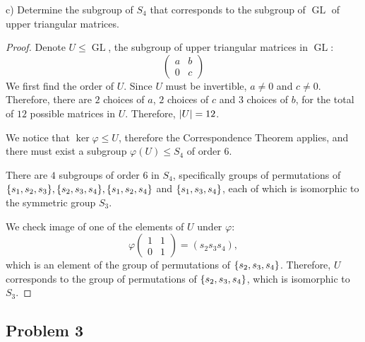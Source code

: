 \documentclass{article}
\theoremstyle{definition}
\newcommand{\GL}{\operatorname{GL}}
\DeclarePairedDelimiter\set{\{}{\}}
\DeclarePairedDelimiter\abs{\lvert}{\rvert}
\begin{document}
\begin{tcolorbox}
c) Determine the subgroup of $S_4$ that corresponds to the subgroup of $\GL$ of upper triangular matrices.
\end{tcolorbox}

\begin{proof}

Denote $U \leq \GL$, the subgroup of upper triangular matrices in $\GL$:
\[
    \begin{pmatrix}
        a & b \\
        0 & c
    \end{pmatrix}
\]
We first find the order of $U$. Since $U$ must be invertible, $a \neq 0$ and $c \neq 0$. Therefore, there are $2$ choices of $a$, $2$ choices of $c$ and $3$ choices of $b$, for the total of $12$ possible matrices in $U$. Therefore, $\abs{U}=12$.

We notice that $\ker \varphi \leq U$, therefore the Correspondence Theorem applies, and there must exist a subgroup $\varphi(U) \leq S_4$ of order $6$.

There are $4$ subgroups of order $6$ in $S_4$, specifically groups of permutations of $\set{s_1,s_2,s_3}, \set{s_2,s_3,s_4}, \set{s_1,s_2,s_4}$ and $\set{s_1,s_3,s_4}$, each of which is isomorphic to the symmetric group $S_3$.

We check image of one of the elements of $U$ under $\varphi$:
\[
    \varphi
    \begin{pmatrix}
        1 & 1 \\
        0 & 1
    \end{pmatrix} = 
    (s_2 s_3 s_4),
\]
which is an element of the group of permutations of $\set{s_2,s_3,s_4}$.
Therefore, $U$ corresponds to the group of permutations of $\set{s_2,s_3,s_4}$, which is isomorphic to $S_3$.

\end{proof}


\subsection*{Problem 3}
\end{document}
